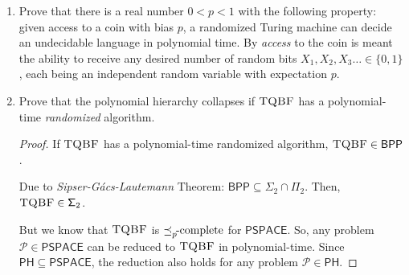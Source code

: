 \documentclass[usletter]{article}
\newcommand {\langset}[1]      {\ensuremath{\mathcal{#1}}}
\newcommand {\machine}[1]      {\ensuremath{\mathscr{#1}}}
\newcommand {\namedlangset}[1] {\ensuremath{\textnormal{\textsc{#1}}}}
\newcommand {\family}[1]       {\ensuremath{\mathsf{#1}}}
\newcommand {\term}[1]      {\textit{#1}}
\newcommand {\namethm}[1]   {\term{#1} Theorem}
\newcommand {\reduce}[2]    {\ensuremath{\preceq_{#1}^{#2}}}
\newcommand {\complete}[2]  {\ensuremath{\reduce{#1}{#2}     %
                                         \hspace*{-4pt}\textnormal{-complete}}}
\newcommand {\PH}     {\family{PH}}
\newcommand {\NP}     {\family{NP}}
\newcommand {\RP}     {\family{RP}}
\newcommand {\BPP}    {\family{BPP}}
\newcommand {\PSPACE} {\family{PSPACE}}
\newcommand {\FPi}    {\family{\Pi}}
\newcommand {\FSigma} {\family{\Sigma}}
\begin{document}
\begin{enumerate}[labelsep=2.5em, label=\textbf{\arabic{enumi}}]
\begin{proof}
    As \machine{R} now has a false-negative rate $\leq \frac{n}{e^{k/2}} \leq
    \frac{n}{3n} = \frac{1}{3}$; it establishes that
    $\namedlangset{SAT} \in \RP$; starting with the assumption that
    $\namedlangset{SAT} \in \BPP$. \\
    And since $\namedlangset{SAT} \in \RP$, we would have the same for any
    \NP-complete problem.
  \end{proof}
  \begin{remark}
    The above proof implies : $\NP \subseteq \RP$. But in fact $\NP = \RP$! \\
    This is because $\RP \subseteq \NP$, as discussed in class -- a problem
    being in \RP, shows that it has at least \textit{exponentially} many
    certificates; which is a subset of problems with at least \textit{one}
    certificate (\NP).
  \end{remark}


  \item Prove that there is a real number $0 < p < 1$ with the following
        property: given access to a coin with bias $p$, a randomized Turing
        machine can decide an undecidable language in polynomial time. By
        \textit{access} to the coin is meant the ability to receive any desired
        number of random bits $X_1, X_2, X_3 \ldots \in \{0,1\}$, each being an
        independent random variable with expectation $p$.


  \item Prove that the polynomial hierarchy collapses if \namedlangset{TQBF} has
        a polynomial-time \textit{randomized} algorithm.
  \begin{proof}
    If \namedlangset{TQBF} has a polynomial-time randomized algorithm,
    $\namedlangset{TQBF} \in \BPP$.

    Due to \namethm{Sipser-G\'{a}cs-Lautemann}\cite{Lautemann1983}:
    $\BPP \subseteq \FSigma_2 \cap \FPi_2$.
    Then, $\namedlangset{TQBF} \in \FSigma_2$.

    But we know that \namedlangset{TQBF} is \complete{p}{} for \PSPACE. So, any
    problem $\langset{P} \in \PSPACE$ can be reduced to \namedlangset{TQBF} in
    polynomial-time. Since $\PH \subseteq \PSPACE$, the reduction also holds for
    any problem $\langset{P} \in \PH$.


\end{proof}
\end{enumerate}
\end{document}
